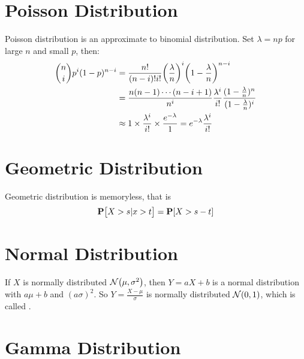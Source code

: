 \section{Poisson Distribution}

Poisson distribution is an approximate to binomial distribution. Set $\lambda = n p $ for large $n$ and small $p$, then:
\begin{equation*}
    \begin{aligned}
        \binom{n}{i}p^i (1-p)^{n-i} &= \frac{n!}{(n-i)! i!} \mleft(\frac{\lambda}{n} \mright)^i \mleft(1-\frac{\lambda}{n} \mright)^{n-i} \\
        &= \frac{n (n-1) \cdots (n - i + 1)}{n^i} \frac{\lambda^i}{i!} \frac{(1- \frac{\lambda}{n})^n}{(1- \frac{\lambda}{n})^i} \\
        & \approx 1 \times \frac{\lambda^i}{i!} \times \frac{e^{- \lambda}}{1} = e^{- \lambda} \frac{\lambda^i}{ i !}
    \end{aligned}
\end{equation*}


\section{Geometric Distribution}

Geometric distribution is memoryless, that is 
\begin{equation}
    \probability{X > s | x > t} = \probability{X > s - t}
\end{equation}


\section{Normal Distribution}

\begin{theorem}
    If $X$ is normally distributed $\normaldistribution{\mu}{\sigma^2}$, then $Y = aX + b$ is a normal distribution with $a\mu + b$ and $(a\sigma)^2$. So $Y =\displaystyle \frac{X - \mu}{\sigma}$ is normally distributed $\normaldistribution{0}{1}$, which is called .
\end{theorem}



\section{Gamma Distribution}


